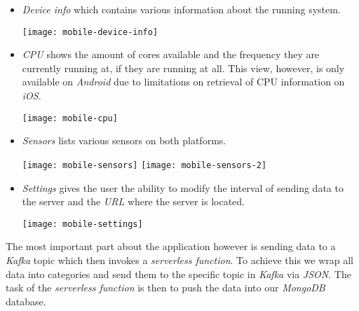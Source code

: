\begin{itemize}
  \item \textit{Device info} which contains various information about the running system.

  \begin{center}
    \texttt{[image: mobile-device-info]}
  \end{center}

  \item \textit{CPU} shows the amount of cores available and the frequency they are currently running at, if they are running at all. This view, however, is only available on \textit{Android} due to limitations on retrieval of CPU information on \textit{iOS}.

  \begin{center}
    \texttt{[image: mobile-cpu]}
  \end{center}

  \item \textit{Sensors} lists various sensors on both platforms.

  \begin{center}
    \texttt{[image: mobile-sensors]}
    \texttt{[image: mobile-sensors-2]}
  \end{center}

  \item \textit{Settings} gives the user the ability to modify the interval of sending data to the server and the \textit{URL} where the server is located.

  \begin{center}
    \texttt{[image: mobile-settings]}
  \end{center}
\end{itemize}

The most important part about the application however is sending data to a \textit{Kafka} topic which then invokes a \textit{serverless function}. To achieve this we wrap all data into categories and send them to the specific topic in \textit{Kafka} via \textit{JSON}. The task of the \textit{serverless function} is then to push the data into our \textit{MongoDB} database.
